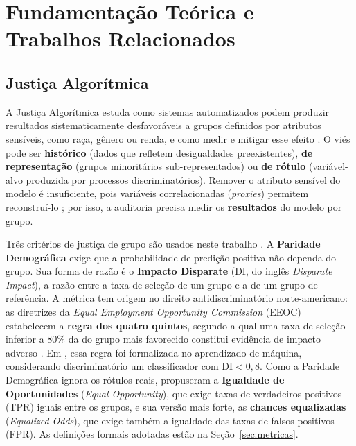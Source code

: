 \section{Fundamentação Teórica e Trabalhos Relacionados}
\label{sec:fundamentacao}

\subsection{Justiça Algorítmica}
\label{sec:fund_fairness}

A Justiça Algorítmica estuda como sistemas automatizados podem produzir resultados sistematicamente desfavoráveis a grupos definidos por atributos sensíveis, como raça, gênero ou renda, e como medir e mitigar esse efeito \cite{barocas2023fairness}. O viés pode ser \textbf{histórico} (dados que refletem desigualdades preexistentes), \textbf{de representação} (grupos minoritários sub-representados) ou \textbf{de rótulo} (variável-alvo produzida por processos discriminatórios). Remover o atributo sensível do modelo é insuficiente, pois variáveis correlacionadas (\textit{proxies}) permitem reconstruí-lo \cite{dwork2012fairness}; por isso, a auditoria precisa medir os \textbf{resultados} do modelo por grupo.

Três critérios de justiça de grupo são usados neste trabalho \cite{barocas2023fairness}. A \textbf{Paridade Demográfica} exige que a probabilidade de predição positiva não dependa do grupo. Sua forma de razão é o \textbf{Impacto Disparate} (DI, do inglês \textit{Disparate Impact}), a razão entre a taxa de seleção de um grupo e a de um grupo de referência. A métrica tem origem no direito antidiscriminatório norte-americano: as diretrizes da \textit{Equal Employment Opportunity Commission} (EEOC) estabelecem a \textbf{regra dos quatro quintos}, segundo a qual uma taxa de seleção inferior a 80\% da do grupo mais favorecido constitui evidência de impacto adverso \cite{eeoc1978uniform}. Em \cite{feldman2015certifying}, essa regra foi formalizada no aprendizado de máquina, considerando discriminatório um classificador com $\mathrm{DI} < 0{,}8$. Como a Paridade Demográfica ignora os rótulos reais, \cite{hardt2016equality} propuseram a \textbf{Igualdade de Oportunidades} (\textit{Equal Opportunity}), que exige taxas de verdadeiros positivos (TPR) iguais entre os grupos, e sua versão mais forte, as \textbf{chances equalizadas} (\textit{Equalized Odds}), que exige também a igualdade das taxas de falsos positivos (FPR). As definições formais adotadas estão na Seção~\ref{sec:metricas}.

